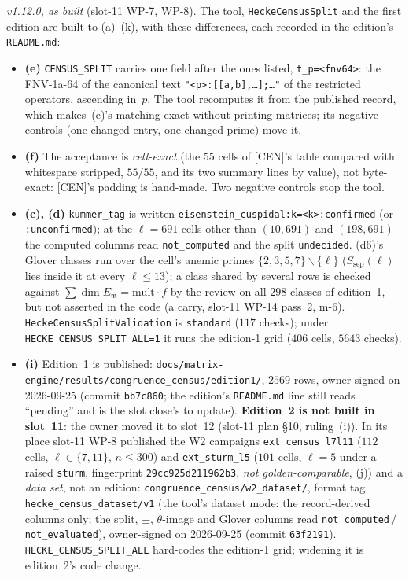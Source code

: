 \documentclass[11pt]{article}
\theoremstyle{remark}
\newcommand{\m}{\mathfrak{m}}
\begin{document}
\emph{v1.12.0, as built} (slot-11 WP-7, WP-8). The tool, \texttt{HeckeCensusSplit} and the first edition
are built to (a)--(k), with these differences, each recorded in the edition's \texttt{README.md}:
\begin{itemize}
\item \textbf{(e)} \texttt{CENSUS\_SPLIT} carries one field after the ones listed, \texttt{t\_p=<fnv64>}:
  the FNV-1a-64 of the canonical text \texttt{"<p>:[[a,b],\ldots];\ldots"} of the restricted operators,
  ascending in~$p$. The tool recomputes it from the published record, which makes~(e)'s matching exact
  without printing matrices; its negative controls (one changed entry, one changed prime) move it.
\item \textbf{(f)} The acceptance is \emph{cell-exact} (the $55$ cells of [CEN]'s table compared with
  whitespace stripped, $55/55$, and its two summary lines by value), not byte-exact: [CEN]'s padding is
  hand-made. Two negative controls stop the tool.
\item \textbf{(c), (d)} \texttt{kummer\_tag} is written \texttt{eisenstein\_cuspidal:k=<k>:confirmed} (or
  \texttt{:unconfirmed}); at the $\ell=691$ cells other than $(10,691)$ and $(198,691)$ the computed
  columns read \texttt{not\_computed} and the split \texttt{undecided}. (d6)'s Glover classes run over the
  cell's anemic primes $\{2,3,5,7\}\smallsetminus\{\ell\}$ ($S_{\mathrm{sep}}(\ell)$ lies inside it at every
  $\ell\le13$); a class shared by several rows is checked against $\sum\dim E_\m=\text{mult}\cdot f$ by the
  review on all $298$ classes of edition~1, but not asserted in the code (a carry, slot-11 WP-14 pass~2,
  m-6). \texttt{HeckeCensusSplitValidation} is \texttt{standard} ($117$ checks); under
  \texttt{HECKE\_CENSUS\_SPLIT\_ALL=1} it runs the edition-1 grid ($406$ cells, $5643$ checks).
\item \textbf{(i)} Edition~1 is published: \texttt{docs/matrix-engine/results/congruence\_census/edition1/},
  $2569$ rows, owner-signed on 2026-09-25 (commit \texttt{bb7c860}; the edition's \texttt{README.md} line
  still reads ``pending'' and is the slot close's to update). \textbf{Edition~2 is not built in slot~11}:
  the owner moved it to slot~12 (slot-11 plan \S10, ruling~(i)). In its place slot-11 WP-8 published the
  W2 campaigns \texttt{ext\_census\_l7l11} ($112$ cells, $\ell\in\{7,11\}$, $n\le300$) and
  \texttt{ext\_sturm\_l5} ($101$ cells, $\ell=5$ under a raised \texttt{sturm}, fingerprint
  \texttt{29cc925d211962b3}, \emph{not golden-comparable}, (j)) and a \emph{data set}, not an edition:
  \texttt{congruence\_census/w2\_dataset/}, format tag \texttt{hecke\_census\_dataset/v1} (the tool's
  dataset mode: the record-derived columns only; the split, $\pm$, $\theta$-image and Glover columns read
  \texttt{not\_computed}\,/\,\texttt{not\_evaluated}), owner-signed on 2026-09-25 (commit \texttt{63f2191}).
  \texttt{HECKE\_CENSUS\_SPLIT\_ALL} hard-codes the edition-1 grid; widening it is edition~2's code change.
\end{itemize}
\end{document}
